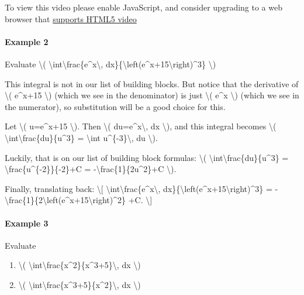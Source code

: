 To view this video please enable JavaScript, and consider upgrading to a
web browser that \href{http://videojs.com/html5-video-support/}{supports
HTML5 video}

\hypertarget{example-2}{%
\paragraph{Example 2}\label{example-2}}

Evaluate \textbackslash{}(
\textbackslash{}int\textbackslash{}frac\{e\^{}x\textbackslash{},
dx\}\{\textbackslash{}left(e\^{}x+15\textbackslash{}right)\^{}3\}
\textbackslash{})

This integral is not in our list of building blocks. But notice that the
derivative of \textbackslash{}( e\^{}x+15 \textbackslash{}) (which we
see in the denominator) is just \textbackslash{}( e\^{}x
\textbackslash{}) (which we see in the numerator), so substitution will
be a good choice for this.

Let \textbackslash{}( u=e\^{}x+15 \textbackslash{}). Then
\textbackslash{}( du=e\^{}x\textbackslash{}, dx \textbackslash{}), and
this integral becomes \textbackslash{}(
\textbackslash{}int\textbackslash{}frac\{du\}\{u\^{}3\} =
\textbackslash{}int u\^{}\{-3\}\textbackslash{}, du \textbackslash{}).

Luckily, that is on our list of building block formulas:
\textbackslash{}(
\textbackslash{}int\textbackslash{}frac\{du\}\{u\^{}3\} =
\textbackslash{}frac\{u\^{}\{-2\}\}\{-2\}+C =
-\textbackslash{}frac\{1\}\{2u\^{}2\}+C \textbackslash{}).

Finally, translating back: \textbackslash{}{[}
\textbackslash{}int\textbackslash{}frac\{e\^{}x\textbackslash{},
dx\}\{\textbackslash{}left(e\^{}x+15\textbackslash{}right)\^{}3\} =
-\textbackslash{}frac\{1\}\{2\textbackslash{}left(e\^{}x+15\textbackslash{}right)\^{}2\}
+C. \textbackslash{}{]}

\hypertarget{example-3}{%
\paragraph{Example 3}\label{example-3}}

Evaluate

\begin{enumerate}
\tightlist
\item
  \textbackslash{}(
  \textbackslash{}int\textbackslash{}frac\{x\^{}2\}\{x\^{}3+5\}\textbackslash{},
  dx \textbackslash{})
\item
  \textbackslash{}(
  \textbackslash{}int\textbackslash{}frac\{x\^{}3+5\}\{x\^{}2\}\textbackslash{},
  dx \textbackslash{})
\end{enumerate}

